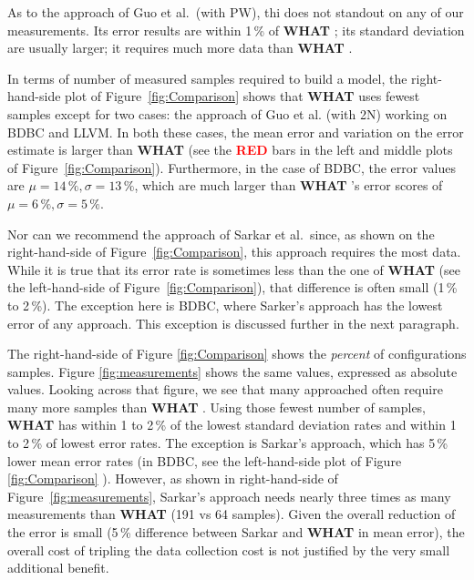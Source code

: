 \documentclass{sig-alternative}
\newcommand{\bi}{\begin{itemize}}%
\newcommand{\what}{{\bf WHAT }}
\begin{document}
As to the approach of Guo et al.\ (with PW), thi   does not standout on any of
our measurements. Its error results are within 1\,\% of \what;
 its standard deviation are usually larger; it requires
 much more data than \what.
 
 In terms of number of measured samples required to build a model, 
 the right-hand-side plot of  Figure~\ref{fig:Comparison}  shows that
 \what uses fewest samples except for two cases:
 the approach of Guo et al. (with 2N) working on BDBC and LLVM.  In both these cases, the mean error and variation on the error
 estimate is   larger than \what  (see the \textcolor{red}{{\bf RED}} bars in the left and middle plots   of Figure~\ref{fig:Comparison}). Furthermore, in the case of BDBC, the error values
 are  $\mu=14\,\%, \sigma=13\,\%$, which are much larger
than \what's error scores of $\mu=6\,\%, \sigma=5\,\%$. 

Nor can we recommend the approach of Sarkar et al.\ since,
as shown on the right-hand-side of Figure~\ref{fig:Comparison}, 
this approach requires the most data.
While it is true that its error rate 
is sometimes less than the one of \what (see the left-hand-side of
Figure~\ref{fig:Comparison}), that difference is often small (1\,\%
to 2\,\%). The exception here is BDBC, where Sarker's approach has the lowest
error of any approach. This exception is discussed further in the
next paragraph.
 

The right-hand-side of Figure \ref{fig:Comparison}   shows
the {\em percent} of configurations samples. Figure \ref{fig:measurements} shows the same values,
expressed as absolute values. Looking across that figure,
we see that many approached often require many more samples than
\what.  Using those fewest number of samples, \what has
within 1 to 2\,\% of the lowest standard deviation rates 
and within 1 to 2\,\% of lowest error rates.
The exception is Sarkar's approach, which has 5\,\% lower mean error
rates (in BDBC, see the left-hand-side plot of Figure \ref{fig:Comparison} ).  However, 
as shown in right-hand-side of Figure~\ref{fig:measurements}, Sarkar's approach needs nearly three times
as many measurements than \what (191 vs 64 samples). Given
the overall reduction of the error is   small (5\,\% difference
between Sarkar and \what in mean error), the overall
cost of tripling the data collection cost is
not justified by the very small additional benefit. 


    
\end{document}
